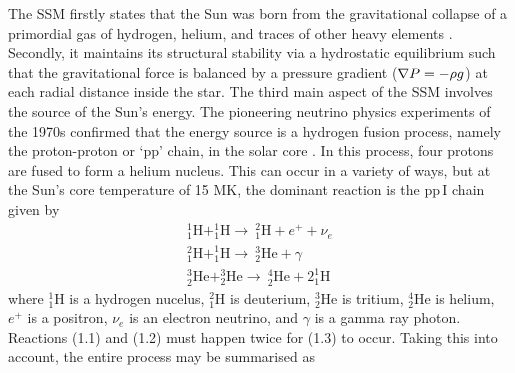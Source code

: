 The SSM firstly states that the Sun was born from the gravitational collapse of a primordial gas of hydrogen, helium, and traces of other heavy elements \citep{sackmann1993}. Secondly, it maintains its structural stability via a hydrostatic equilibrium such that the gravitational force is balanced by a pressure gradient (${\bf \nabla }{P}=-\rho g$) at each radial distance inside the star. The third main aspect of the SSM involves the source of the Sun's energy. 
The pioneering neutrino physics experiments of the 1970s confirmed that the energy source is a hydrogen fusion process, namely the proton-proton or `pp' chain, in the solar core \citep{davis1968}. In this process, four protons are fused to form a helium nucleus. This can occur in a variety of ways, but at the Sun's core temperature of 15 MK, the dominant reaction is the pp\,I chain given by
\begin{eqnarray}
^{1}_1\mathrm{H} + ^{1}_1\mathrm{H} \rightarrow ~^{2}_1\mathrm{H} + e^{+}  + \nu_e \\
%
^{2}_1\mathrm{H} + ^{1}_1\mathrm{H} \rightarrow ~^{3}_2\mathrm{He} + \gamma \\
%
^{3}_2\mathrm{He}+^{3}_2\mathrm{He} \rightarrow ~^{4}_2\mathrm{He} + 2^{1}_1\mathrm{H}
\end{eqnarray}
where $^{1}_1\mathrm{H}$ is a hydrogen nucelus, $^{2}_1\mathrm{H}$ is deuterium, $^{3}_2\mathrm{He}$ is tritium, $^{4}_2\mathrm{He}$ is helium, $e^{+}$ is a positron, $\nu_e$ is an electron neutrino, and $\gamma$ is a gamma ray photon. Reactions (1.1) and (1.2) must happen twice for (1.3) to occur. Taking this into account, the entire process may be summarised as 
